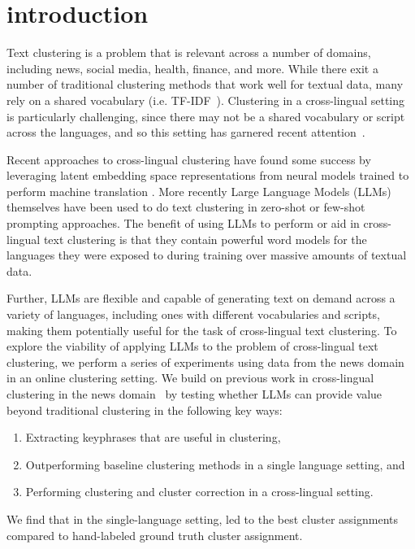 \section{introduction}\label{section:introduction}

Text clustering is a problem that is relevant across a number of domains, including news, social media, health, finance, and more.
While there exit a number of traditional clustering methods that work well for textual data, many rely on a shared vocabulary (i.e. TF-IDF~).
Clustering in a cross-lingual setting is particularly challenging, since there may not be a shared vocabulary or script across the languages, and so this setting has garnered recent attention~\cite{Schneider2023}.

Recent approaches to cross-lingual clustering have found some success by leveraging latent embedding space representations from neural models trained to perform machine translation .
More recently Large Language Models (LLMs) themselves have been used to do text clustering in zero-shot or few-shot prompting approaches.
The benefit of using LLMs to perform or aid in cross-lingual text clustering is that they contain powerful word models for the languages they were exposed to during training over massive amounts of textual data.

Further, LLMs are flexible and capable of generating text on demand across a variety of languages, including ones with different vocabularies and scripts, making them potentially useful for the task of cross-lingual text clustering.
To explore the viability of applying LLMs to the problem of cross-lingual text clustering, we perform a series of experiments using data from the news domain in an online clustering setting.
We build on previous work in cross-lingual clustering in the news domain~\cite{Schneider2023} by testing whether LLMs can provide value beyond traditional clustering in the following key ways:
\begin{enumerate}
    \item Extracting keyphrases that are useful in clustering,
    \item Outperforming baseline clustering methods in a single  language setting, and
    \item Performing clustering and cluster correction in a cross-lingual setting.
\end{enumerate}

We find that in the single-language setting,  led to the best cluster assignments compared to hand-labeled ground truth cluster assignment.

